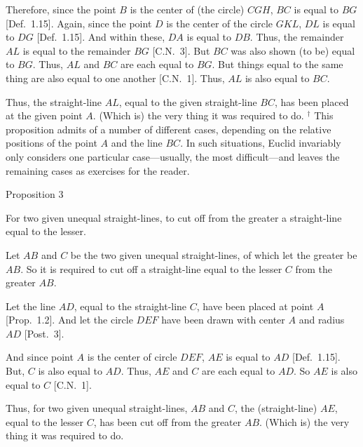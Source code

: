 \epsfysize=3in
\centerline{}

Therefore, since the point $B$ is the center of (the circle) $CGH$, $BC$ is equal to 
$BG$ [Def.~1.15]. Again, since the point $D$ is the center of the circle $GKL$, $DL$ is equal to $DG$ [Def.~1.15]. And within these,  $DA$ is equal to $DB$. Thus, the remainder $AL$ is equal to the remainder $BG$ [C.N.~3]. But $BC$ was also shown (to be)  equal to $BG$. Thus,  $AL$
and $BC$ are each equal to $BG$. But things equal to the same thing are also equal to one another [C.N.~1]. Thus, $AL$ is also equal to $BC$.

Thus, the straight-line $AL$, equal to the given straight-line $BC$,
has been placed at the given point $A$. (Which is) the very thing it was required to do.
{\footnotesize
\noindent $^\dag$ This proposition admits of a number
of different cases, depending on the relative positions of the point $A$
and the line $BC$. In such situations, Euclid invariably only considers one
particular case---usually, the most difficult---and leaves the remaining cases as
exercises for the reader.}


\begin{center}
{\large Proposition 3}
\end{center}

For two given unequal straight-lines, to cut off from the greater a straight-line
equal to the lesser.

Let $AB$ and $C$ be the two given unequal straight-lines, of which let the greater be $AB$. So it is required to cut off a straight-line equal to the lesser $C$ from the greater $AB$.

Let the line $AD$, equal to the straight-line $C$, have been placed at  point $A$ [Prop.~1.2]. And let
the circle $DEF$ have been drawn with center $A$ and radius $AD$ [Post.~3].

And since  point $A$ is the center of  circle $DEF$, $AE$ is equal to $AD$ [Def.~1.15]. But,
$C$ is also equal to $AD$. Thus, $AE$ and $C$ are each equal to $AD$. So $AE$
is also equal to $C$ [C.N.~1].

\epsfysize=2.25in
\centerline{}

Thus, for two given unequal straight-lines, $AB$ and $C$, the (straight-line) $AE$, equal to
the lesser $C$, has been cut off from the greater $AB$. (Which is) the very thing it was required to do.

